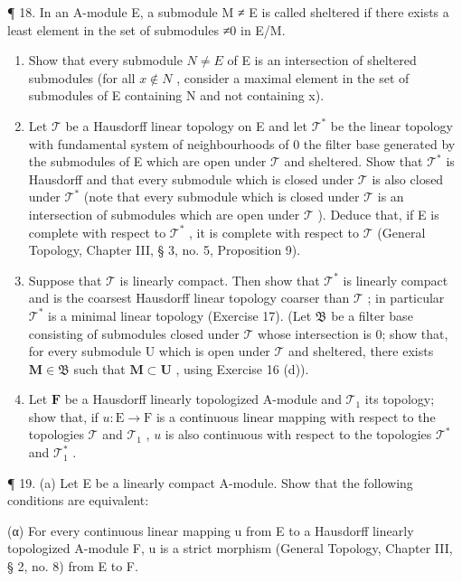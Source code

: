 ¶ 18. In an A-module E, a submodule M ≠ E is called sheltered if there exists a least element in the set of submodules ≠0 in E/M.

\begin{enumerate}
\def\labelenumi{(\alph{enumi})}
\item
  Show that every submodule \(N \neq E\) of E is an intersection of sheltered submodules (for all \(x \notin N\) , consider a maximal element in the set of submodules of E containing N and not containing x).
\item
  Let \(\mathcal{T}\) be a Hausdorff linear topology on E and let \(\mathcal{T}^*\) be the linear topology with fundamental system of neighbourhoods of 0 the filter base generated by the submodules of E which are open under \(\mathcal{T}\) and sheltered. Show that \(\mathcal{T}^*\) is Hausdorff and that every submodule which is closed under \(\mathcal{T}\) is also closed under \(\mathcal{T}^*\) (note that every submodule which is closed under \(\mathcal{T}\) is an intersection of submodules which are open under \(\mathcal{T}\) ). Deduce that, if E is complete with respect to \(\mathcal{T}^*\) , it is complete with respect to \(\mathcal{T}\) (General Topology, Chapter III, § 3, no. 5, Proposition 9).
\item
  Suppose that \(\mathcal{T}\) is linearly compact. Then show that \(\mathcal{T}^*\) is linearly compact and is the coarsest Hausdorff linear topology coarser than \(\mathcal{T}\) ; in particular \(\mathcal{T}^*\) is a minimal linear topology (Exercise 17). (Let \(\mathfrak{B}\) be a filter base consisting of submodules closed under \(\mathcal{T}\) whose intersection is 0; show that, for every submodule U which is open under \(\mathcal{T}\) and sheltered, there exists \(\mathbf{M} \in \mathfrak{B}\) such that \(\mathbf{M} \subset \mathbf{U}\) , using Exercise 16 (d)).
\item
  Let \(\mathbf{F}\) be a Hausdorff linearly topologized A-module and \(\mathcal{T}_1\) its topology; show that, if \(u: \mathrm{E} \to \mathrm{F}\) is a continuous linear mapping with respect to the topologies \(\mathcal{T}\) and \(\mathcal{T}_1\) , \(u\) is also continuous with respect to the topologies \(\mathcal{T}^*\) and \(\mathcal{T}_1^*\) .
\end{enumerate}

¶ 19. (a) Let E be a linearly compact A-module. Show that the following conditions are equivalent:

(α) For every continuous linear mapping u from E to a Hausdorff linearly topologized A-module F, u is a strict morphism (General Topology, Chapter III, § 2, no. 8) from E to F.

